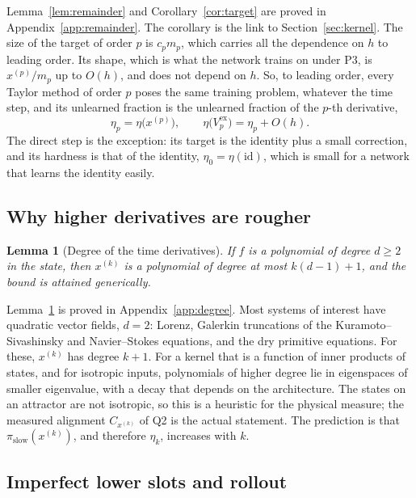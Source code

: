 \documentclass[11pt]{article}
\newtheorem{lemma}{Lemma}
\theoremstyle{definition}
\theoremstyle{remark}
\newcommand{\ex}{\mathrm{ex}}
\newcommand{\id}{\mathrm{id}}
\newcommand{\slow}{\mathrm{slow}}
\begin{document}
Lemma~\ref{lem:remainder} and Corollary~\ref{cor:target} are proved in Appendix~\ref{app:remainder}.
The corollary is the link to Section~\ref{sec:kernel}.
The size of the target of order $p$ is $c_p m_p$, which carries all the dependence on $h$ to leading order.
Its shape, which is what the network trains on under P3, is $x^{(p)}/m_p$ up to $O(h)$, and does not depend on $h$.
So, to leading order, every Taylor method of order $p$ poses the same training problem, whatever the time step, and its unlearned fraction is the unlearned fraction of the $p$-th derivative,
\begin{equation}\label{eq:eta-p}
\eta_p = \eta\big(x^{(p)}\big), \qquad \eta\big(V_p^\ex\big) = \eta_p + O(h) .
\end{equation}
The direct step is the exception: its target is the identity plus a small correction, and its hardness is that of the identity, $\eta_0 = \eta(\id)$, which is small for a network that learns the identity easily.

\subsection{Why higher derivatives are rougher}

\begin{lemma}[Degree of the time derivatives]\label{lem:degree}
If $f$ is a polynomial of degree $d \ge 2$ in the state, then $x^{(k)}$ is a polynomial of degree at most $k(d-1) + 1$, and the bound is attained generically.
\end{lemma}

Lemma~\ref{lem:degree} is proved in Appendix~\ref{app:degree}.
Most systems of interest have quadratic vector fields, $d = 2$: Lorenz, Galerkin truncations of the Kuramoto--Sivashinsky and Navier--Stokes equations, and the dry primitive equations.
For these, $x^{(k)}$ has degree $k+1$.
For a kernel that is a function of inner products of states, and for isotropic inputs, polynomials of higher degree lie in eigenspaces of smaller eigenvalue, with a decay that depends on the architecture.
The states on an attractor are not isotropic, so this is a heuristic for the physical measure; the measured alignment $C_{x^{(k)}}$ of Q2 is the actual statement.
The prediction is that $\pi_\slow(x^{(k)})$, and therefore $\eta_k$, increases with $k$.

\subsection{Imperfect lower slots and rollout}
\end{document}

